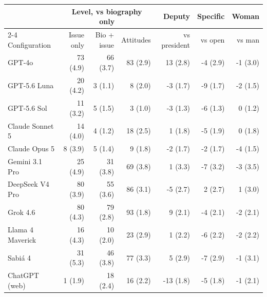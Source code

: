 \begin{tabular}{lrrrrrr}
\toprule
 & \multicolumn{3}{c}{Level, vs biography only} & Deputy & Specific & Woman \\
\cmidrule(lr){2-4}
Configuration & Issue only & Bio + issue & Attitudes & vs president & vs open & vs man \\
\midrule
GPT-4o & 73 (4.9) & 66 (3.7) & 83 (2.9) & 13 (2.8) & -4 (2.9) & -1 (3.0) \\
GPT-5.6 Luna & 20 (4.2) & 3 (1.1) & 8 (2.0) & -3 (1.7) & -9 (1.7) & -2 (1.5) \\
GPT-5.6 Sol & 11 (3.2) & 5 (1.5) & 3 (1.0) & -3 (1.3) & -6 (1.3) & 0 (1.2) \\
Claude Sonnet 5 & 14 (4.0) & 4 (1.2) & 18 (2.5) & 1 (1.8) & -5 (1.9) & 0 (1.8) \\
Claude Opus 5 & 8 (3.9) & 5 (1.4) & 9 (1.8) & -2 (1.7) & -2 (1.7) & -4 (1.5) \\
Gemini 3.1 Pro & 25 (4.9) & 31 (3.8) & 69 (3.8) & 1 (3.3) & -7 (3.2) & -3 (3.5) \\
DeepSeek V4 Pro & 80 (3.9) & 55 (3.6) & 86 (3.1) & -5 (2.7) & 2 (2.7) & 1 (3.0) \\
Grok 4.6 & 80 (4.3) & 79 (2.8) & 93 (1.8) & 9 (2.1) & -4 (2.1) & -2 (2.1) \\
Llama 4 Maverick & 16 (4.3) & 10 (2.0) & 23 (2.9) & 1 (2.2) & -6 (2.2) & -2 (2.2) \\
Sabi\'a 4 & 31 (5.3) & 46 (3.8) & 77 (3.3) & 5 (2.9) & -7 (2.9) & -1 (3.1) \\
ChatGPT (web) & 1 (1.9) & 18 (2.4) & 16 (2.2) & -13 (1.8) & -5 (1.8) & -1 (2.1) \\
\bottomrule
\end{tabular}
